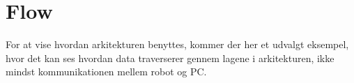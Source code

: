 
\section{Flow}
For at vise hvordan arkitekturen benyttes, kommer der her et udvalgt eksempel, hvor det kan ses hvordan data traverserer gennem lagene i arkitekturen, ikke mindst kommunikationen mellem robot og PC.

